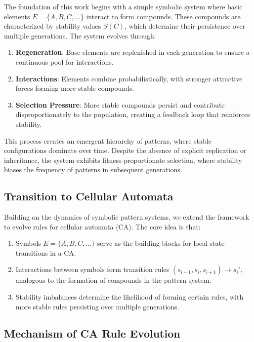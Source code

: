 \documentclass[entropy,article,submit,pdftex,moreauthors]{Definitions/mdpi}
\begin{document}
The foundation of this work begins with a simple symbolic system where basic elements \( E = \{A, B, C, \ldots\} \) interact to form compounds. These compounds are characterized by stability values \( S(C) \), which determine their persistence over multiple generations. The system evolves through:
\begin{enumerate}
    \item \textbf{Regeneration}: Base elements are replenished in each generation to ensure a continuous pool for interactions.
    \item \textbf{Interactions}: Elements combine probabilistically, with stronger attractive forces forming more stable compounds.
    \item \textbf{Selection Pressure}: More stable compounds persist and contribute disproportionately to the population, creating a feedback loop that reinforces stability.
\end{enumerate}

This process creates an emergent hierarchy of patterns, where stable configurations dominate over time. Despite the absence of explicit replication or inheritance, the system exhibits fitness-proportionate selection, where stability biases the frequency of patterns in subsequent generations.

\subsection{Transition to Cellular Automata}

Building on the dynamics of symbolic pattern systems, we extend the framework to evolve rules for cellular automata (CA). The core idea is that:
\begin{enumerate}
    \item Symbols \( E = \{A, B, C, \ldots\} \) serve as the building blocks for local state transitions in a CA.
    \item Interactions between symbols form transition rules \( (s_{i-1}, s_i, s_{i+1}) \rightarrow s_i' \), analogous to the formation of compounds in the pattern system.
    \item Stability imbalances determine the likelihood of forming certain rules, with more stable rules persisting over multiple generations.
\end{enumerate}

\subsection{Mechanism of CA Rule Evolution}
\end{document}
